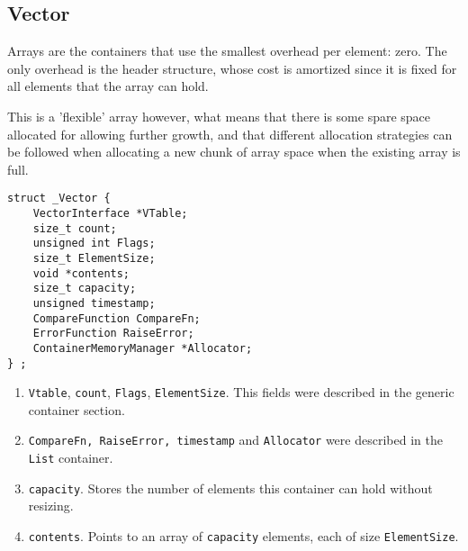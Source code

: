 \documentclass[12pt,a4paper]{memoir} %
\begin{document}
{{\subsection{Vector}
Arrays are the containers that use the smallest overhead per element: zero. The only overhead is the header structure, whose cost is amortized since it is fixed for all elements that the array can hold.

This is a 'flexible' array however, what means that there is some spare space allocated for allowing further growth, and that different allocation strategies can be followed when allocating a new chunk of array space when the existing array is full.
\begin{verbatim}
struct _Vector {
    VectorInterface *VTable;
    size_t count;          
    unsigned int Flags;    
    size_t ElementSize;	
    void *contents;        
    size_t capacity;       
    unsigned timestamp;
    CompareFunction CompareFn;
    ErrorFunction RaiseError;
    ContainerMemoryManager *Allocator;
} ;
\end{verbatim}
\begin{enumerate}
\item \texttt{Vtable}, \texttt{count}, \texttt{Flags}, \texttt{ElementSize}. This fields were described in the generic container section.
\item \texttt{CompareFn, RaiseError, timestamp} and \texttt{Allocator} were described in the \texttt{List} container.
\item \texttt{capacity}. Stores the number of elements this container can hold without resizing.
\item \texttt{contents}. Points to an array of \texttt{capacity} elements, each of size \texttt{ElementSize}.
\end{enumerate}
}}
\end{document}
